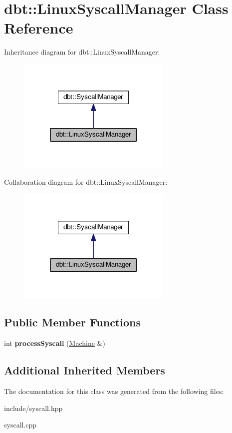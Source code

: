 \hypertarget{classdbt_1_1_linux_syscall_manager}{}\section{dbt\+:\+:Linux\+Syscall\+Manager Class Reference}
\label{classdbt_1_1_linux_syscall_manager}


Inheritance diagram for dbt\+:\+:Linux\+Syscall\+Manager\+:\nopagebreak
\begin{figure}[H]
\begin{center}
\leavevmode
\includegraphics[width=209pt]{classdbt_1_1_linux_syscall_manager__inherit__graph}
\end{center}
\end{figure}


Collaboration diagram for dbt\+:\+:Linux\+Syscall\+Manager\+:\nopagebreak
\begin{figure}[H]
\begin{center}
\leavevmode
\includegraphics[width=209pt]{classdbt_1_1_linux_syscall_manager__coll__graph}
\end{center}
\end{figure}
\subsection*{Public Member Functions}
\begin{DoxyCompactItemize}
\item 
int {\bfseries process\+Syscall} (\hyperlink{classdbt_1_1_machine}{Machine} \&)\hypertarget{classdbt_1_1_linux_syscall_manager_a83a4ee04caf5b5854a33a51bd9239075}{}\label{classdbt_1_1_linux_syscall_manager_a83a4ee04caf5b5854a33a51bd9239075}

\end{DoxyCompactItemize}
\subsection*{Additional Inherited Members}


The documentation for this class was generated from the following files\+:\begin{DoxyCompactItemize}
\item 
include/syscall.\+hpp\item 
syscall.\+cpp\end{DoxyCompactItemize}
